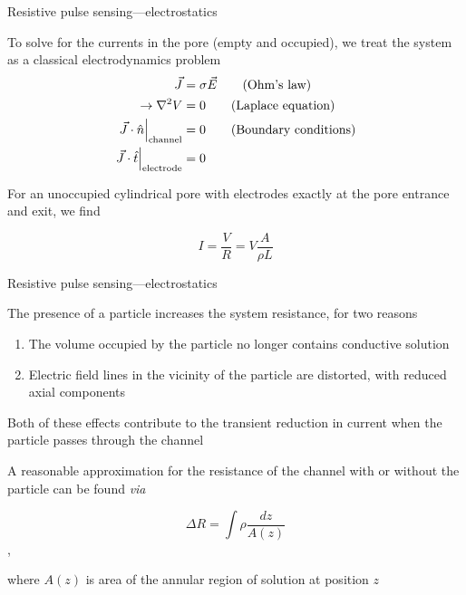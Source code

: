 
\begin{frame}[c]{Resistive pulse sensing---electrostatics}

	To solve for the currents in the pore (empty and occupied), we treat the system as a classical electrodynamics problem \\
		\begin{align}		
			\vec{J} &= \sigma\vec{E} \tag{Ohm's law} \\
			\rightarrow \nabla^{2}V &= 0 \tag{Laplace equation} \\
			\left. \vec{J}\cdot\hat{n}\right\vert_{\mathrm{channel}} &= 0 \tag{Boundary conditions}\\
			\left. \vec{J}\cdot\hat{t}\right\vert_{\mathrm{electrode}} &= 0 \notag
		\end{align}
		
	For an unoccupied cylindrical pore with electrodes exactly at the pore entrance and exit, we find
	
	\begin{equation} \tag{Ideal cylinder}
		I=\frac{V}{R}=V\frac{A}{\rho L}
	\end{equation}
	

\end{frame}




\begin{frame}[c]{Resistive pulse sensing---electrostatics}


		The presence of a particle increases the system resistance, for two reasons
		
		\begin{enumerate}
			\item The volume occupied by the particle no longer contains conductive solution
			\item Electric field lines in the vicinity of the particle are distorted, with reduced axial components
		\end{enumerate}
		
		Both of these effects contribute to the transient reduction in current when the particle passes through the channel
		
		A reasonable approximation for the resistance of the channel with or without the particle can be found \textit{via}
		
		\[ \Delta R=\int\rho\frac{dz}{A\left(z\right)} \],
		
		where $A\left(z\right)$ is area of the annular region of solution at position $z$

		
	

\end{frame}


